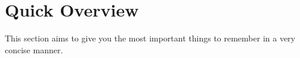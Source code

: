 \section{Quick Overview}
This section aims to give you the most important things to remember in a very concise manner.







